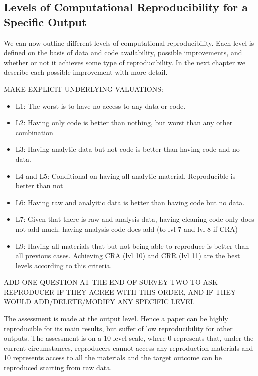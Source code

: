 \documentclass[]{book}
\providecommand{\tightlist}{%
  \setlength{\itemsep}{0pt}\setlength{\parskip}{0pt}}
\begin{document}
\hypertarget{levels-of-computational-reproducibility-for-a-specific-output}{%
\subsection{Levels of Computational Reproducibility for a Specific Output}\label{levels-of-computational-reproducibility-for-a-specific-output}}

We can now outline different levels of computational reproducibility. Each level is defined on the basis of data and code availability, possible improvements, and whether or not it achieves some type of reproducibility. In the next chapter we describe each possible improvement with more detail.

MAKE EXPLICIT UNDERLYING VALUATIONS:

\begin{itemize}
\tightlist
\item
  L1: The worst is to have no access to any data or code.\\
\item
  L2: Having only code is better than nothing, but worst than any other combination\\
\item
  L3: Having analytic data but not code is better than having code and no data.
\item
  L4 and L5: Conditional on having all analytic material. Reproducible is better than not
\item
  L6: Having raw and analyitic data is better than having code but no data.\\
\item
  L7: Given that there is raw and analysis data, having cleaning code only does not add much. having analysis code does add (to lvl 7 and lvl 8 if CRA)\\
\item
  L9: Having all materials that but not being able to reproduce is better than all previous cases. Achieving CRA (lvl 10) and CRR (lvl 11) are the best levels according to this criteria.
\end{itemize}

ADD ONE QUESTION AT THE END OF SURVEY TWO TO ASK REPRODUCER IF THEY AGREE WITH THIS ORDER, AND IF THEY WOULD ADD/DELETE/MODIFY ANY SPECIFIC LEVEL

The assessment is made at the output level. Hence a paper can be highly reproducible for its main results, but suffer of low reproducibility for other outputs. The assessment is on a 10-level scale, where 0 represents that, under the current circumstances, reproducers cannot access any reproduction materials and 10 represents access to all the materials and the target outcome can be reproduced starting from raw data.
\end{document}
